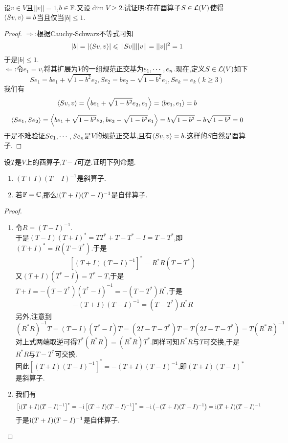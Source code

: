 \documentclass{ctexart}
\begin{document}
\begin{problem}[14.]
    设$v\in V$且$||v||=1$,$b\in\mathbb{F}$.又设$\dim V\geqslant2$.试证明:存在酉算子$S\in\mathcal{L}(V)$使得$\left\langle{Sv},{v}\right\rangle=b$当且仅当$|b|\leqslant1$.
\end{problem}
\begin{proof}
    $\Rightarrow$:根据Cauchy-Schwarz不等式可知
    \[|b|=\left|\left\langle{Sv},{v}\right\rangle\right|\leqslant||Sv||||v||=||v||^2=1\]
    于是$|b|\leqslant1$.\\
    $\Leftarrow$:令$e_1=v$,将其扩展为$V$的一组规范正交基为${e}_1,\cdots,{e}_{n}$.现在,定义$S\in\mathcal{L}(V)$如下
    \[Se_1=be_1+\sqrt{1-b^2}e_2,Se_2=be_2-\sqrt{1-b^2}e_1,Se_k=e_k(k\geqslant3)\]
    我们有
    \[\left\langle{Sv},{v}\right\rangle=\left\langle{be_1+\sqrt{1-b^2}e_2},{e_1}\right\rangle=\left\langle{be_1},{e_1}\right\rangle=b\]
    \[\left\langle{Se_1},{Se_2}\right\rangle=\left\langle{be_1+\sqrt{1-b^2}e_2},{be_2-\sqrt{1-b^2}e_1}\right\rangle=b\sqrt{1-b^2}-b\sqrt{1-b^2}=0\]
    于是不难验证${Se}_1,\cdots,{Se}_{n}$是$V$的规范正交基,且有$\left\langle{Sv},{v}\right\rangle=b$.这样的$S$自然是酉算子.
\end{proof}
\begin{problem}[15.]
    设$T$是$V$上的酉算子,$T-I$可逆.证明下列命题.
    \begin{enumerate}[label=\tbf{(\arabic*)}]
        \item $(T+I)(T-I)^{-1}$是斜算子.
        \item 若$\mathbb{F}=\mathbb{C}$,那么$\text{i}(T+I)(T-I)^{-1}$是自伴算子.
    \end{enumerate}
\end{problem}
\begin{proof}
    \begin{enumerate}[label=\tbf{(\arabic*)}]
        \item 令$R=(T-I)^{-1}$.\\
            于是$(T-I)(T+I)^*=TT^*+T-T^*-I=T-T^*$,即$(T+I)^*=R(T-T^*)$.于是
            \[\left[(T+I)(T-I)^{-1}\right]^*=R^*R(T-T^*)\]
            又$(T+I)(T^*-I)=T^*-T$,于是$T+I=-(T-T^*)(T^*-I)^{-1}=-(T-T^*)R^*$,于是
            \[-(T+I)(T-I)^{-1}=(T-T^*)R^*R\]
            另外,注意到
            \[\left(R^*R\right)^{-1}T=(T-I)(T^*-I)T=(2I-T-T^*)T=T(2I-T-T^*)=T(R^*R)^{-1}\]
            对上式两端取逆可得$T^*(R^*R)=(R^*R)T^*$.同样可知$R^*R$与$T$可交换,于是$R^*R$与$T-T^*$可交换.\\
            因此$\left[(T+I)(T-I)^{-1}\right]^*=-(T+I)(T-I)^{-1}$,即$(T+I)(T-I)^*$是斜算子.
        \item 我们有
            \[\left[\text{i}(T+I)(T-I)^{-1}\right]^*=-\text{i}\left[(T+I)(T-I)^{-1}\right]^*=-\text{i}\left(-(T+I)(T-I)^{-1}\right)=\text{i}(T+I)(T-I)^{-1}\]
            于是$\text{i}(T+I)(T-I)^{-1}$是自伴算子.
    \end{enumerate}
\end{proof}
\end{document}
